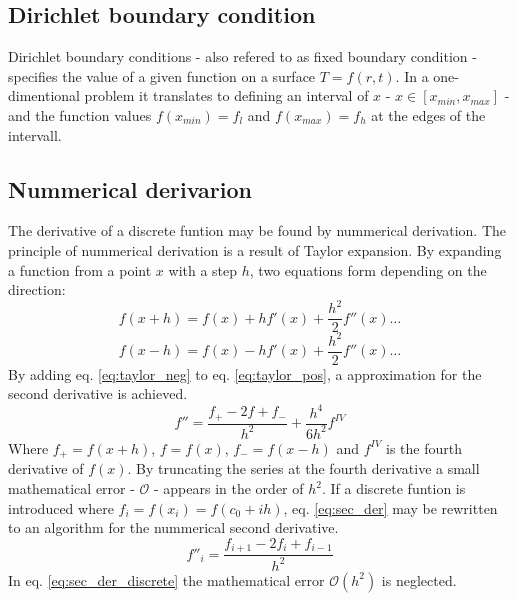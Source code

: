 \documentclass[twoside,twocolumn]{article}
\begin{document}
\subsection{Dirichlet boundary condition}
Dirichlet boundary conditions - also refered to as fixed boundary condition - specifies the value of a given function on a surface $T=f(r,t)$. In a one-dimentional problem it translates to defining an interval of $x$ - $x\in [x_{min},x_{max}]$ - and the function values $f(x_{min})=f_l$ and $f(x_{max})=f_h$ at the edges of the intervall.
\subsection{Nummerical derivarion}
The derivative of a discrete funtion may be found by nummerical derivation. The principle of nummerical derivation is a result of Taylor expansion. By expanding a function from   a point $x$ with a step $h$, two equations form depending on the direction:
\begin{equation}
f(x+h) = f(x)+hf'(x)+\frac{h^2}{2}f''(x)\ldots \label{eq:taylor_pos}
\end{equation}
\begin{equation}
f(x-h) = f(x)-hf'(x)+\frac{h^2}{2}f''(x)\ldots \label{eq:taylor_neg}
\end{equation}
By adding eq. \ref{eq:taylor_neg} to eq. \ref{eq:taylor_pos}, a approximation for the second derivative is achieved.
\begin{equation}
f'' = \frac{f_+-2f+f_-}{h^2}+\frac{h^4}{6h^2}f^{\mathit{IV}}\label{eq:sec_der}
\end{equation}
Where $f_+ = f(x+h)$, $f=f(x)$, $f_-=f(x-h)$ and $f^{IV}$ is the fourth derivative of $f(x)$. By truncating the series at the fourth derivative a small mathematical error - $\mathcal{O}$ - appears in the order of $h^2$. If a discrete funtion is introduced where $f_i = f(x_i) = f(c_0+ih)$, eq. \ref{eq:sec_der} may be rewritten to an algorithm for the nummerical second derivative.
\begin{equation}
f''_i = \frac{f_{i+1}-2f_i+f_{i-1}}{h^2}\label{eq:sec_der_discrete}
\end{equation}
In eq. \ref{eq:sec_der_discrete} the mathematical error $\mathcal{O}(h^2)$ is neglected.
\end{document}
